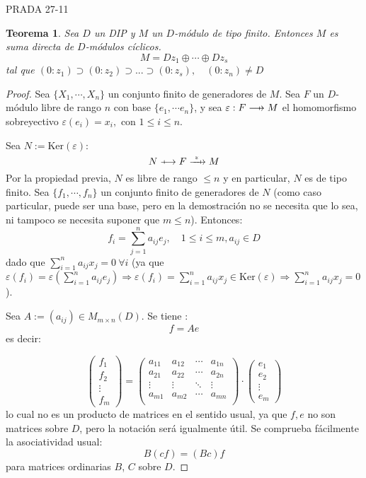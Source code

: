 \documentclass{article}
\def\flechaInyectiva {\mathrel{\ooalign{\thinspace\thinspace$\mapstochar\mkern5mu$\hfil\cr$\longrightarrow$\cr}}}
\def\xFlechaSobreyectiva #1{\mathrel{\ooalign{\hfil$\mapstochar\mkern5mu$\thinspace\thinspace\cr$\xrightarrow{#1}$\cr}}}
\def\flechaSobreyectiva {\mathrel{\ooalign{\hfil$\mapstochar\mkern5mu$\thinspace\thinspace\cr$\longrightarrow$\cr}}}
\theoremstyle{theorem-style}  %
\newtheorem{theorem}{Teorema}[section]  %
\theoremstyle{definition}
\theoremstyle{example-style}
\begin{document}
	PRADA 27-11
	\begin{theorem}
		Sea $ D $ un DIP y $ M $ un $ D $-módulo de tipo finito. Entonces $ M $ es suma directa de $ D$-módulos cíclicos.
		\[ M=Dz_1 \oplus \cdots \oplus Dz_s \]
		tal que $ (0:z_1) \supset (0:z_2) \supset ... \supset (0:z_s), \quad (0:z_n)\neq D $

	\end{theorem}
	\begin{proof}
		Sea $ \{X_1,\cdots, X_n\} $ un conjunto finito de generadores de $ M $. Sea $ F $ un $ D $-módulo libre de rango $ n $ con base $ \{e_1, \cdots e_n\} $, y sea $ \varepsilon:F\flechaSobreyectiva M $ el homomorfismo sobreyectivo $ \varepsilon(e_i)=x_i, \text{ con } 1\leq i\leq n $.

		Sea $ N:=\text{Ker}(\varepsilon) $:
		\[ N\flechaInyectiva F \xFlechaSobreyectiva{\ \varepsilon \ } M \]
		Por la propiedad previa, $ N $ es libre de rango $ \leq n $ y en particular, $ N $ es de tipo finito. Sea $ \{f_1, \cdots, f_n\} $ un conjunto finito de generadores de $ N $ (como caso particular, puede ser una base, pero en la demostración no se necesita que lo sea, ni tampoco se necesita suponer que $ m\leq n $). Entonces:
		\[ f_i = \sum_{j=1}^{n}a_{ij}e_j, \quad 1\leq i\leq m, a_{ij}\in D \]
		dado que $ \sum_{i=1}^{n} a_{ij}x_j=0 \ \forall i$  (ya que $ \varepsilon(f_i)=\varepsilon(\sum_{i=1}^{n} a_{ij} e_j)\Rightarrow \varepsilon(f_i)=  \sum_{i=1}^{n} a_{ij}x_j \in \text{Ker}(\varepsilon)\Rightarrow \sum_{i=1}^{n} a_{ij}x_j=0$).

		Sea $ A:=(a_{ij})\in M_{m \times n}(D) $. Se tiene :
		\[ f=Ae \]
		es decir:

		\[ \begin{pmatrix}
			 f_1 \\
			 f_2 \\
			 \vdots \\
			 f_m
		\end{pmatrix} = \begin{pmatrix}
		a_{11} & a_{12} & \cdots & a_{1n} \\
		a_{21} & a_{22} & \cdots & a_{2n} \\
		\vdots & \vdots & \ddots & \vdots \\
		a_{m1} & a_{m2} & \cdots & a_{mn} \\
		\end{pmatrix} \cdot \begin{pmatrix}
		e_1 \\
		e_2 \\
		\vdots \\
		e_m
		\end{pmatrix}\]
		lo cual no es un producto de matrices en el sentido usual, ya que $ f,e $ no son matrices sobre $ D $, pero la notación será igualmente útil. Se comprueba fácilmente la asociatividad usual:
		\[ B(cf)=(Bc)f \]
		para matrices ordinarias $ B $, $ C $ sobre $ D $.


\end{proof}
\end{document}
